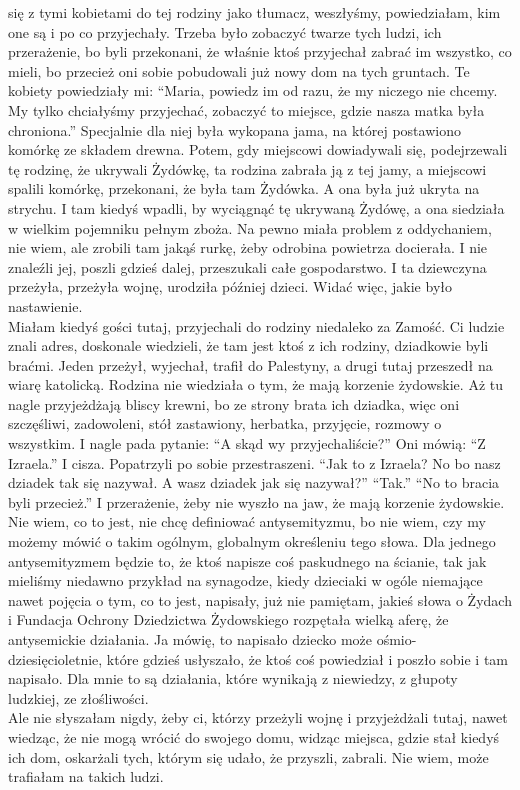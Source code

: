 \begin{otherlanguage}{polish}
się z tymi kobietami do tej rodziny jako tłumacz, weszłyśmy, powiedziałam, kim one są i po co przyjechały. Trzeba było zobaczyć twarze tych ludzi, ich przerażenie, bo byli przekonani, że właśnie ktoś przyjechał zabrać im wszystko, co mieli, bo przecież oni sobie pobudowali już nowy dom na tych gruntach. Te kobiety powiedziały mi: "`Maria, powiedz im od razu, że my niczego nie chcemy. My tylko chciałyśmy przyjechać, zobaczyć to miejsce, gdzie nasza matka była chroniona."' Specjalnie dla niej była wykopana jama, na której postawiono komórkę ze składem drewna. Potem, gdy miejscowi dowiadywali się, podejrzewali tę rodzinę, że ukrywali Żydówkę, ta rodzina zabrała ją z tej jamy, a miejscowi spalili komórkę, przekonani, że była tam Żydówka. A ona była już ukryta na strychu. I tam kiedyś wpadli, by wyciągnąć tę ukrywaną Żydówę, a ona siedziała w wielkim pojemniku pełnym zboża. Na pewno miała problem z oddychaniem, nie wiem, ale zrobili tam jakąś rurkę, żeby odrobina powietrza docierała. I nie znaleźli jej, poszli gdzieś dalej, przeszukali całe gospodarstwo. I ta dziewczyna przeżyła, przeżyła wojnę, urodziła później dzieci. Widać więc, jakie było nastawienie.\\
Miałam kiedyś gości tutaj, przyjechali do rodziny niedaleko za Zamość. Ci ludzie znali adres, doskonale wiedzieli, że tam jest ktoś z ich rodziny, dziadkowie byli braćmi. Jeden przeżył, wyjechał, trafił do Palestyny, a drugi tutaj przeszedł na wiarę katolicką. Rodzina nie wiedziała o tym, że mają korzenie żydowskie. Aż tu nagle przyjeżdżają bliscy krewni, bo ze strony brata ich dziadka, więc oni szczęśliwi, zadowoleni, stół zastawiony, herbatka, przyjęcie, rozmowy o wszystkim. I nagle pada pytanie: "`A skąd wy przyjechaliście?"' Oni mówią: "`Z Izraela."' I cisza. Popatrzyli po sobie przestraszeni. "`Jak to z Izraela? No bo nasz dziadek tak się nazywał. A wasz dziadek jak się nazywał?"' "`Tak."' "`No to bracia byli przecież."' I przerażenie, żeby nie wyszło na jaw, że mają korzenie żydowskie. Nie wiem, co to jest, nie chcę definiować antysemityzmu, bo nie wiem, czy my możemy mówić o takim ogólnym, globalnym określeniu tego słowa. Dla jednego antysemityzmem będzie to, że ktoś napisze coś paskudnego na ścianie, tak jak mieliśmy niedawno przykład na synagodze, kiedy dzieciaki w ogóle niemające nawet pojęcia o tym, co to jest, napisały, już nie pamiętam, jakieś słowa o Żydach i Fundacja Ochrony Dziedzictwa Żydowskiego rozpętała wielką aferę, że antysemickie działania. Ja mówię, to napisało dziecko może ośmio- dziesięcioletnie, które gdzieś usłyszało, że ktoś coś powiedział i poszło sobie i tam napisało. Dla mnie to są działania, które wynikają z niewiedzy, z głupoty ludzkiej, ze złośliwości.\\
Ale nie słyszałam nigdy, żeby ci, którzy przeżyli wojnę i przyjeżdżali tutaj, nawet wiedząc, że nie mogą wrócić do swojego domu, widząc miejsca, gdzie stał kiedyś ich dom, oskarżali tych, którym się udało, że przyszli, zabrali. Nie wiem, może trafiałam na takich ludzi.


\end{otherlanguage}
